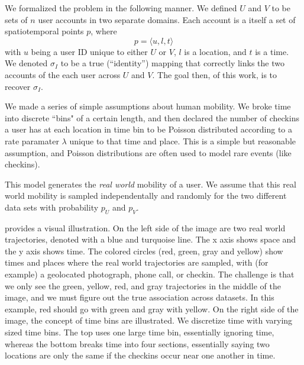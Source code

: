 We formalized the problem in the following manner.
We defined $U$ and $V$ to be sets of $n$ user accounts in two separate domains.
Each account is a itself a set of spatiotemporal points $p$, where
\[ p = \langle u, l, t \rangle \]
with $u$ being a user ID unique to either $U$ or $V$, $l$ is a location, and $t$ is a time.
We denoted $\sigma_I$ to be a true (``identity'') mapping that correctly links the two accounts of the each user across $U$ and $V$.
The goal then, of this work, is to recover $\sigma_I$.
    
We made a series of simple assumptions about human mobility.
We broke time into discrete ``bins" of a certain length, and then declared the number of checkins a user has at each location in time bin to be Poisson distributed according to a rate paramater $\lambda$ unique to that time and place.
This is a simple but reasonable assumption, and Poisson distributions are often used to model rare events (like checkins).

This model generates the \emph{real world} mobility of a user.
We assume that this real world mobility is sampled independentally and randomly for the two different data sets with probability $p_U$ and $p_V$.

 provides a visual illustration.
On the left side of the image are two real world trajectories, denoted with a blue and turquoise line.
The x axis shows space and the y axis shows time.
The colored circles (red, green, gray and yellow) show times and places where the real world trajectories are sampled, with (for example) a geolocated photograph, phone call, or checkin.
The challenge is that we only see the green, yellow, red, and gray trajectories in the middle of the image, and we must figure out the true association across datasets.
In this example, red should go with green and gray with yellow.
On the right side of the image, the concept of time bins are illustrated.
We discretize time with varying sized time bins.
The top uses one large time bin, essentially ignoring time, whereas the bottom breaks time into four sections, essentially saying two locations are only the same if the checkins occur near one another in time.


